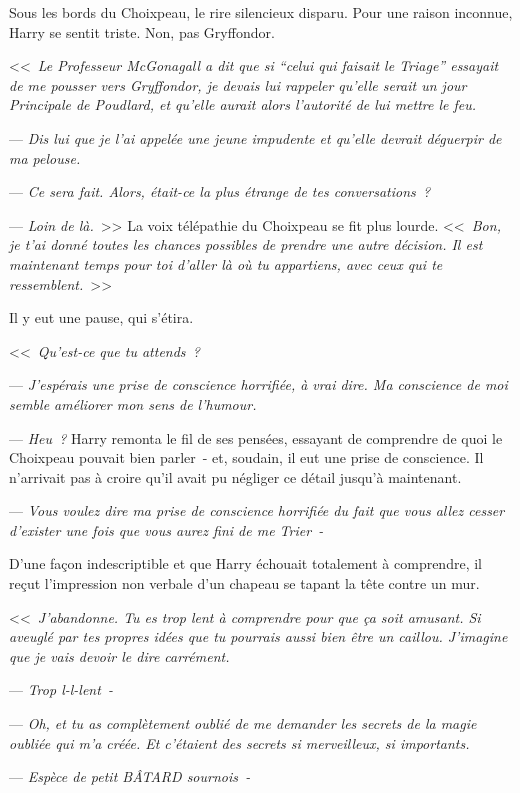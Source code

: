 Sous les bords du Choixpeau, le rire silencieux disparu. Pour une raison inconnue, Harry se sentit triste. Non, pas Gryffondor.

<<~\emph{Le Professeur McGonagall a dit que si “celui qui faisait le Triage” essayait de me pousser vers Gryffondor, je devais lui rappeler qu'elle serait un jour Principale de Poudlard, et qu'elle aurait alors l'autorité de lui mettre le feu.}

--- \emph{Dis lui que je l'ai appelée une jeune impudente et qu'elle devrait déguerpir de ma pelouse.}

--- \emph{Ce sera fait. Alors, était-ce la plus étrange de tes conversations~?}

--- \emph{Loin de là.}~>> La voix télépathie du Choixpeau se fit plus lourde. <<~\emph{Bon, je t'ai donné toutes les chances possibles de prendre une autre décision. Il est maintenant temps pour toi d'aller là où tu appartiens, avec ceux qui te ressemblent.}~>>

Il y eut une pause, qui s'étira.

<<~\emph{Qu'est-ce que tu attends~?}

--- \emph{J'espérais une prise de conscience horrifiée, à vrai dire. Ma conscience de moi semble améliorer mon sens de l'humour.}

--- \emph{Heu~?} Harry remonta le fil de ses pensées, essayant de comprendre de quoi le Choixpeau pouvait bien parler~- et, soudain, il eut une prise de conscience. Il n'arrivait pas à croire qu'il avait pu négliger ce détail jusqu'à maintenant.

--- \emph{Vous voulez dire ma prise de conscience horrifiée du fait que vous allez cesser d'exister une fois que vous aurez fini de me Trier~-}

D'une façon indescriptible et que Harry échouait totalement à comprendre, il reçut l'impression non verbale d'un chapeau se tapant la tête contre un mur.

<<~\emph{J'abandonne. Tu es trop lent à comprendre pour que ça soit amusant. Si aveuglé par tes propres idées que tu pourrais aussi bien être un caillou. J'imagine que je vais devoir le dire carrément.}

--- \emph{Trop l-l-lent~-}

--- \emph{Oh, et tu as complètement oublié de me demander les secrets de la magie oubliée qui m'a créée. Et c'étaient des secrets si merveilleux, si importants.}

--- \emph{Espèce de petit BÂTARD sournois~-}

